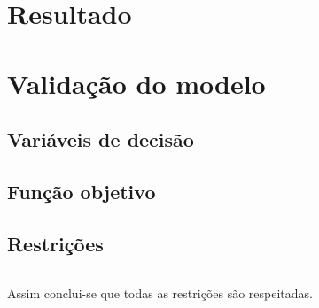 \newpage
\section{Resultado}
\label{p3:resultado}

\section{Validação do modelo}

\subsection{Variáveis de decisão}

\subsection{Função objetivo}

\subsection{Restrições}

\begin{verbatim}
\end{verbatim}

Assim conclui-se que todas as restrições são respeitadas.
